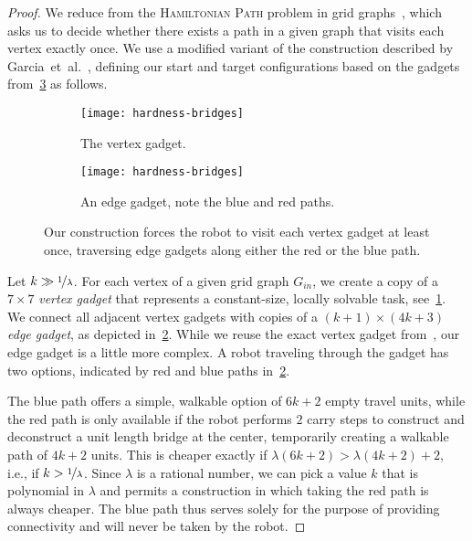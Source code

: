 \begin{proof}
	We reduce from the \textsc{Hamiltonian Path} problem in grid graphs~\cite{ItaiPS82}, which asks us to decide whether there exists a path in a given graph that visits each vertex exactly once.
	We use a modified variant of the construction described by Garcia~et~al.~\cite{cooperative-bille-reconfig-ICRA}, defining our start and target configurations based on the gadgets from~\cref{fig:hardness-bridges} as follows.

	\begin{figure}[htb]
		\begin{subfigure}[t]{0.27\textwidth-0.5em}
			\centering%
			\texttt{[image: hardness-bridges]}%
			\caption{The vertex gadget.}%
			\label{fig:hardness-bridges-vertex}%
		\end{subfigure}%
		\hfill%
		\begin{subfigure}[t]{0.73\textwidth-0.5em}
			\centering%
			\texttt{[image: hardness-bridges]}%
			\caption{An edge gadget, note the blue and red paths.}%
			\label{fig:hardness-bridges-edge}%
		\end{subfigure}%
		\caption{Our construction forces the robot to visit each vertex gadget at least once, traversing edge gadgets along either the red or the blue path.}%
		\label{fig:hardness-bridges}
	\end{figure}
	Let $k\gg \nicefrac{1}{\lambda}$.
	For each vertex of a given grid graph $G_{\mathit{in}}$, we create a copy of a $7\times 7$ \emph{vertex gadget} that represents a constant-size, locally solvable task, see~\cref{fig:hardness-bridges-vertex}.
	We connect all adjacent vertex gadgets with copies of a $(k+1)\times (4k+3)$ \emph{edge gadget}, as depicted in~\cref{fig:hardness-bridges-edge}.
	While we reuse the exact vertex gadget from~\cite{cooperative-bille-reconfig-ICRA}, our edge gadget is a little more complex.
	A robot traveling through the gadget has two options, indicated by red and blue paths in~\cref{fig:hardness-bridges-edge}.

	The blue path offers a simple, walkable option of $6k+2$ empty travel units, while the red path is only available if the robot performs $2$ carry steps to construct and deconstruct a unit length bridge at the center, temporarily creating a walkable path of $4k+2$ units.
	This is cheaper exactly if $\lambda(6k+2)>\lambda(4k+2)+2$,
	i.e., if $k > \nicefrac{1}{\lambda}$.
	Since $\lambda$ is a rational number, we can pick a value $k$ that is polynomial in $\lambda$ and permits a construction in which taking the red path is always cheaper.
	The blue path thus serves solely for the purpose of providing connectivity and will never be taken by the robot.


\end{proof}
